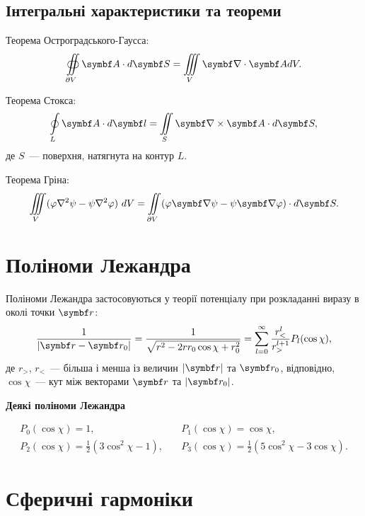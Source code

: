 \subsection{Інтегральні характеристики та теореми}

Теорема Остроградського-Гаусса:
\begin{equation}\label{OGTheorem}
	\oiint\limits_{\partial V} \vect{A}\cdot d\vect{S} = \iiint\limits_V \divg\vect{A} dV.
\end{equation}

Теорема Стокса:
\begin{equation}\label{Stoksheorem}
	\oint\limits_L \vect{A}\cdot d\vect{l} = \iint\limits_S \rot\vect{A} \cdot d\vect{S},
\end{equation}
де $S$~--- поверхня, натягнута на контур $L$.

Теорема Гріна:
\begin{equation}\label{Grin}
	\iiint\limits_{V}(\phi \nabla ^{2}\psi -\psi \nabla ^{2}\phi )\ dV=\iint \limits_{\partial V}(\phi \vect{\nabla} \psi -\psi \vect{\nabla} \phi )\cdot d\vect{S}.
\end{equation}


\section{Поліноми Лежандра}\label{Polinoms}

Поліноми Лежандра застосовуються у теорії потенціалу при розкладанні виразу в околі точки $\vect{r}$:
\begin{equation*}\label{}
    \frac{1}{|\vect{r} - \vect{r}_0|} = \frac{1}{\sqrt{r^2 - 2rr_0 \cos\chi + r_0^2 }}  =  \sum\limits_{l = 0}^{\infty} \frac{r^l_<}{r^{l+1}_>} P_l(\cos\chi),
\end{equation*}
де $r_>$, $r_<$~--- більша і менша із величин $|\vect{r}|$ та $\vect{r}_0$, відповідно, $\cos\chi$~--- кут між векторами $\vect{r}$ та $|\vect{r}_0|$.

\medskip%
\textbf{Деякі поліноми Лежандра}

\begin{align*}
P_{0}(\cos\chi)  = 1, &\quad P_{1}(\cos\chi)  = \cos\chi, \\
P_{2}(\cos\chi)  = \frac {1}{2}(3\cos^2\chi-1), &\quad P_{3}(\cos\chi)  = \frac {1}{2}(5\cos^2\chi-3\cos\chi).
\end{align*}


\section{Сферичні гармоніки}\label{Spherical_Harmonics}

